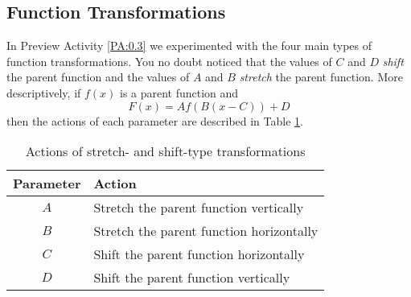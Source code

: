 \subsection*{Function Transformations}
In Preview Activity \ref{PA:0.3} we experimented with the four main types of function
transformations.  You no doubt noticed that the values of $C$ and $D$ {\it shift} the
parent function and the values of $A$ and $B$ {\it stretch} the parent function.  More
descriptively, if $f(x)$ is a parent function and 
\[ F(x) = Af(B(x-C))+D \] 
then the actions of each parameter are described in Table \ref{tab:0.3.trans}.
\begin{table}[h!]
    \centering
    \begin{tabular}{|c|l|}
        \hline
        Parameter & Action \\ \hline \hline
        $A$ & Stretch the parent function vertically \\
        $B$ & Stretch the parent function horizontally \\
        $C$ & Shift the parent function horizontally \\
        $D$ & Shift the parent function vertically \\ \hline
    \end{tabular}
    \caption{Actions of stretch- and shift-type transformations}
    \label{tab:0.3.trans}
\end{table}


